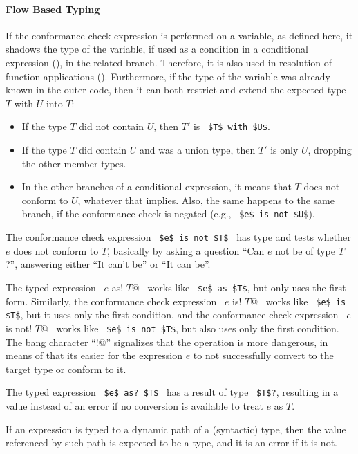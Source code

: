 \paragraph{Flow Based Typing} 
If the conformance check expression is performed on a variable, as defined here, it shadows the type of the variable, if used as a condition in a conditional expression (), in the related branch. Therefore, it is also used in resolution of function applications (). Furthermore, if the type of the variable was already known in the outer code, then it can both restrict and extend the expected type $T$ with $U$ into $T$: 
\begin{itemize}
  \item If the type $T$ did not contain $U$, then $T'$ is ~\lstinline!$T$ with $U$!.
  \item If the type $T$ did contain $U$ and was a union type, then $T'$ is only $U$, dropping the other member types. 
  \item In the other branches of a conditional expression, it means that $T$ does not conform to $U$, whatever that implies. Also, the same happens to the same branch, if the conformance check is negated (e.g., ~\lstinline!$e$ is not $U$!). 
\end{itemize}

The conformance check expression ~\lstinline!$e$ is not $T$!~ has type  and tests whether $e$ does not conform to $T$, basically by asking a question ``Can $e$ not be of type $T$?'', answering either ``It can't be'' or ``It can be''.

The typed expression ~\lstinline@$e$ as! $T$@~ works like ~\lstinline!$e$ as $T$!, but only uses the first form. Similarly, the conformance check expression ~\lstinline@$e$ is! $T$@~ works like ~\lstinline!$e$ is $T$!, but it uses only the first condition, and the conformance check expression ~\lstinline@$e$ is not! $T$@~ works like ~\lstinline!$e$ is not $T$!, but also uses only the first condition. The bang character ``\lstinline@!@'' signalizes that the operation is more dangerous, in means of that its easier for the expression $e$ to not successfully convert to the target type or conform to it. 

The typed expression ~\lstinline!$e$ as? $T$!~ has a result of type ~\lstinline!$T$?!, resulting in a  value instead of an error if no conversion is available to treat $e$ as $T$. 

If an expression is typed to a dynamic path of a (syntactic) type, then the value referenced by such path is expected to be a type, and it is an error if it is not. 






